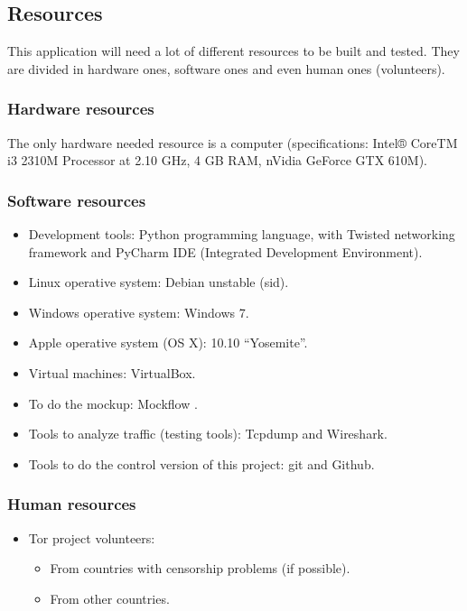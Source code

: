 \subsection{Resources}
\label{ssec:resources}
This application will need a lot of different resources to be built and tested. They are divided in hardware ones, software ones and even human ones (volunteers).

\subsubsection{Hardware resources}
The only hardware needed resource is a computer (specifications: Intel® CoreTM i3 2310M Processor at 2.10 GHz, 4 GB RAM, nVidia GeForce GTX 610M).

\subsubsection{Software resources}
\begin{itemize}
\item Development tools: Python programming language, with Twisted networking framework and PyCharm IDE (Integrated Development Environment).
\item Linux operative system: Debian unstable (sid).
\item Windows operative system: Windows 7.
\item Apple operative system (OS X): 10.10 “Yosemite”.
\item Virtual machines: VirtualBox.
\item To do the mockup: Mockflow \cite{Mockflow}.
\item Tools to analyze traffic (testing tools): Tcpdump and Wireshark.
\item Tools to do the control version of this project: git and Github.
\end{itemize}

\subsubsection{Human resources}
\begin{itemize}
\item Tor project volunteers:
\begin{itemize}
\item From countries with censorship problems (if possible).
\item From other countries.
\end{itemize}
\end{itemize} 
